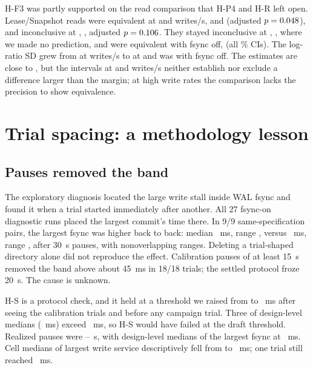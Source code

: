 \documentclass[conference]{IEEEtran}
\begin{document}
H-F3 was partly supported on the read comparison that H-P4 and H-R left open. Lease/Snapshot reads were equivalent at \FollowRateLow{} and \FollowRateSecond{} writes/s, \FollowRatioLow{} and \FollowRatioSecond{} (adjusted $p=0.048$), and inconclusive at \FollowRateThird{}, \FollowRatioThird{}, adjusted $p=0.106$. They stayed inconclusive at \FollowRateHigh{}, \FollowRatioHigh{}, where we made no prediction, and were equivalent with fsync off, \FollowRatioOff{} (all \FollowCI{}\% CIs). The log-ratio SD grew from \FollowSDLow{} at \FollowRateLow{} writes/s to \FollowSDHigh{} at \FollowRateHigh{} and was \FollowSDOff{} with fsync off. The estimates are close to \FollowOne{}, but the intervals at \FollowRateThird{} and \FollowRateHigh{} writes/s neither establish nor exclude a difference larger than the margin; at high write rates the comparison lacks the precision to show equivalence.

\section{Trial spacing: a methodology lesson}
\label{sec:settled}
\subsection{Pauses removed the band}
The exploratory diagnosis located the large write stall inside WAL fsync and found it when a trial started immediately after another. All 27 fsync-on diagnostic runs placed the largest commit's time there. In 9/9 same-specification pairs, the largest fsync was higher back to back: median \StallBackMedian{}~ms, range \StallBackRange{}, versus \StallSettledMedian{}~ms, range \StallSettledRange{}, after 30~s pauses, with nonoverlapping ranges. Deleting a trial-shaped directory alone did not reproduce the effect. Calibration pauses of at least 15~s removed the band above about 45~ms in 18/18 trials; the settled protocol froze 20~s. The cause is unknown.

H-S is a protocol check, and it held at a threshold we raised from \HSDraftMs{} to \HSThresholdMs{}~ms after seeing the calibration trials and before any campaign trial. Three of \HSDesignCount{} design-level medians (\HSAboveDraftRange{}~ms) exceed \HSDraftMs{}~ms, so H-S would have failed at the draft threshold. Realized pauses were \SettledGapMin{}--\SettledGapMax{}~s, with design-level medians of the largest fsync at \SettledHSRange{}~ms. Cell medians of largest write service descriptively fell from \SettledStallPaced{} to \SettledStallSettled{}~ms; one trial still reached \SettledOutlier{}~ms.
\end{document}
